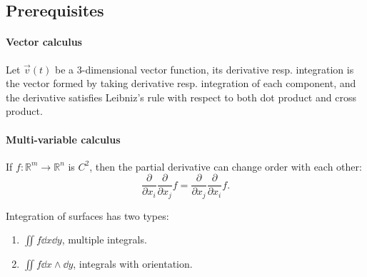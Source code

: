\subsection{Prerequisites}
\label{sub:Prerequisites}
\paragraph{Vector calculus}
Let $\vec{v}(t)$ be a 3-dimensional vector function,
its derivative resp. integration is the vector formed by taking
derivative resp. integration of each component,
and the derivative satisfies Leibniz's rule with respect to both dot product
and cross product.

\paragraph{Multi-variable calculus}
If $f: \mathbb{R}^m\to \mathbb{R}^n$ is $C^2$, then the partial derivative
can change order with each other:
 \[
	\frac{\partial}{\partial x_i} \frac{\partial}{\partial x_j} f =
	\frac{\partial}{\partial x_j} \frac{\partial}{\partial x_i} f.
\]

Integration of surfaces has two types:
\begin{enumerate}
	\item $\iint f \dd x\dd y$, multiple integrals.
	\item $\iint f \dd x\wedge \dd y$, integrals with orientation.
\end{enumerate}
